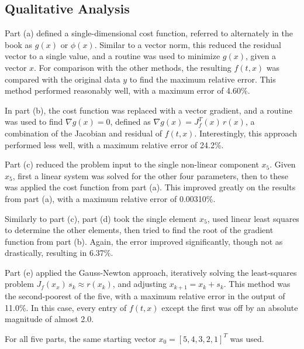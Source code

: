 \documentclass[paper=a4, fontsize=11pt]{scrartcl}
\numberwithin{equation}{section}		%
\numberwithin{figure}{section}			%
\numberwithin{table}{section}				%
\begin{document}
\vspace{4mm}
\subsection{Qualitative Analysis}
\par Part (a) defined a single-dimensional cost function, referred to alternately in the book as $g(x)$ or $\phi(x)$. Similar to a vector norm, this reduced the residual vector to a single value, and a routine was used to minimize $g(x)$, given a vector $x$. For comparison with the other methods, the resulting $f(t,x)$ was compared with the original data $y$ to find the maximum relative error. This method performed reasonably well, with a maximum error of 4.60\%. \\
\par In part (b), the cost function was replaced with a vector gradient, and a routine was used to find $\nabla g(x) = 0$, defined as $\nabla g(x) = J_f^T(x)\,r(x)$, a combination of the Jacobian and residual of $f(t,x)$. Interestingly, this approach performed less well, with a maximum relative error of 24.2\%. \\
\par Part (c) reduced the problem input to the single non-linear component $x_5$. Given $x_5$, first a linear system was solved for the other four parameters, then to these was applied the cost function from part (a). This improved greatly on the results from part (a), with a maximum relative error of 0.00310\%. \\
\par Similarly to part (c), part (d) took the single element $x_5$, used linear least squares to determine the other elements, then tried to find the root of the gradient function from part (b). Again, the error improved significantly, though not as drastically, resulting in 6.37\%. \\
\par Part (e) applied the Gauss-Newton approach, iteratively solving the least-squares problem $J_f(x_x) \, s_k \approx r(x_k)$, and adjusting $x_{k+1} = x_k + s_k$. This method was the second-poorest of the five, with a maximum relative error in the output of 11.0\%. In this case, every entry of $f(t,x)$ except the first was off by an absolute magnitude of almost 2.0. \\
\par For all five parts, the same starting vector $x_0 = [5, 4, 3, 2, 1]^T$ was used. \\
\end{document}
